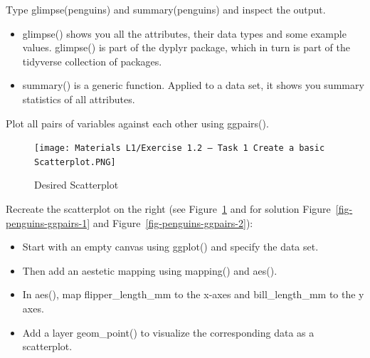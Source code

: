 \documentclass[
  letterpaper,
  DIV=11,
  numbers=noendperiod]{scrartcl}
\begin{document}
Type glimpse(penguins) and summary(penguins) and inspect the output.

\begin{itemize}
\item
  glimpse() shows you all the attributes, their data types and some
  example values. glimpse() is part of the dyplyr package, which in turn
  is part of the tidyverse collection of packages.
\item
  summary() is a generic function. Applied to a data set, it shows you
  summary statistics of all attributes.
\end{itemize}

Plot all pairs of variables against each other using ggpairs().

\begin{figure}

{\centering \texttt{[image: Materials L1/Exercise 1.2 – Task 1 Create a basic Scatterplot.PNG]}

}

\caption{\label{fig-desired-scatterplot}Desired Scatterplot}

\end{figure}

Recreate the scatterplot on the right (see
Figure~\ref{fig-desired-scatterplot} and for solution
Figure~\ref{fig-penguins-ggpairs-1} and
Figure~\ref{fig-penguins-ggpairs-2}):

\begin{itemize}
\item
  Start with an empty canvas using ggplot() and specify the data set.
\item
  Then add an aestetic mapping using mapping() and aes().
\item
  In aes(), map flipper\_length\_mm to the x-axes and bill\_length\_mm
  to the y axes.
\item
  Add a layer geom\_point() to visualize the corresponding data as a
  scatterplot.
\end{itemize}
\end{document}
